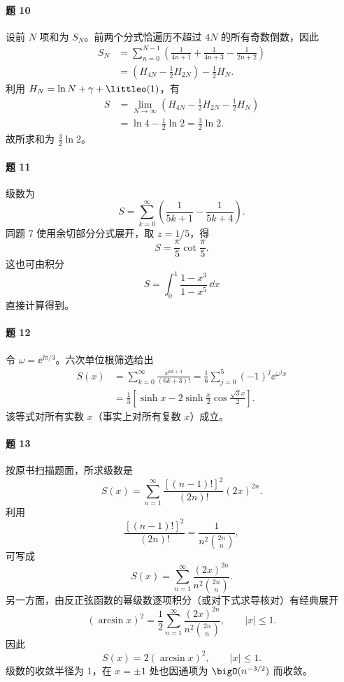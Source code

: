 \paragraph{题 10}
\begin{xsolution}
设前 $N$ 项和为 $S_N$。前两个分式恰遍历不超过 $4N$ 的所有奇数倒数，因此
\[
\begin{aligned}
  S_N
  &=\sum_{n=0}^{N-1}\left(\frac1{4n+1}+\frac1{4n+3}-\frac1{2n+2}\right)\\
  &=\left(H_{4N}-\frac12H_{2N}\right)-\frac12H_N.
\end{aligned}
\]
利用 $H_N=\ln N+\gamma+\littleo(1)$，有
\[
\begin{aligned}
  S
  &=\lim_{N\to\infty}\left(H_{4N}-\frac12H_{2N}-\frac12H_N\right)\\
  &=\ln4-\frac12\ln2=\frac32\ln2.
\end{aligned}
\]
故所求和为 $\frac32\ln2$。
\end{xsolution}

\paragraph{题 11}
\begin{xsolution}
级数为
\[
  S=\sum_{k=0}^{\infty}\left(\frac1{5k+1}-\frac1{5k+4}\right).
\]
同题 7 使用余切部分分式展开，取 $z=1/5$，得
\[
  S=\frac\pi5\cot\frac\pi5.
\]
这也可由积分
\[
  S=\int_0^1\frac{1-x^3}{1-x^5}\,\dd x
\]
直接计算得到。
\end{xsolution}

\paragraph{题 12}
\begin{xsolution}
令 $\omega=\ee^{\ii\pi/3}$。六次单位根筛选给出
\[
\begin{aligned}
  S(x)
  &=\sum_{k=0}^{\infty}\frac{x^{6k+3}}{(6k+3)!}
   =\frac16\sum_{j=0}^5(-1)^j\ee^{\omega^jx}\\
  &=\frac13\left[
    \sinh x-2\sinh\frac x2\cos\frac{\sqrt3x}{2}
  \right].
\end{aligned}
\]
该等式对所有实数 $x$（事实上对所有复数 $x$）成立。
\end{xsolution}

\paragraph{题 13}
\begin{xsolution}
按原书扫描题面，所求级数是
\[
  S(x)=\sum_{n=1}^{\infty}
  \frac{[(n-1)!]^2}{(2n)!}(2x)^{2n}.
\]
利用
\[
  \frac{[(n-1)!]^2}{(2n)!}
  =\frac1{n^2\binom{2n}{n}},
\]
可写成
\[
  S(x)=\sum_{n=1}^{\infty}
  \frac{(2x)^{2n}}{n^2\binom{2n}{n}}.
\]
另一方面，由反正弦函数的幂级数逐项积分（或对下式求导核对）有经典展开
\[
  (\arcsin x)^2
  =\frac12\sum_{n=1}^{\infty}
  \frac{(2x)^{2n}}{n^2\binom{2n}{n}},
  \qquad |x|\leqslant1.
\]
因此
\[
  S(x)=2(\arcsin x)^2,\qquad |x|\leqslant1.
\]
级数的收敛半径为 $1$，在 $x=\pm1$ 处也因通项为 $\bigO(n^{-3/2})$ 而收敛。
\end{xsolution}

